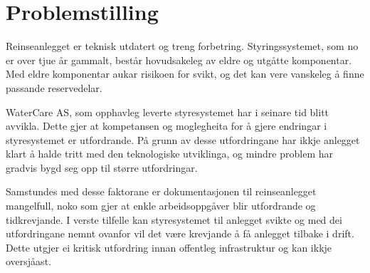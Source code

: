 \section{Problemstilling}
Reinseanlegget er teknisk utdatert og treng forbetring. Styringssystemet, som no er over tjue år gammalt,
består hovudsakeleg av eldre og utgåtte komponentar. Med eldre komponentar aukar risikoen for svikt, 
og det kan vere vanskeleg å finne passande reservedelar.

WaterCare AS\citep{WaterCare}, som opphavleg leverte styresystemet har i seinare tid blitt avvikla. Dette gjer at kompetansen 
og moglegheita for å gjere endringar i styresystemet er utfordrande. 
På grunn av desse utfordringane har ikkje anlegget klart å halde tritt med den teknologiske utviklinga, 
og mindre problem har gradvis bygd seg opp til større utfordringar.

Samstundes med desse faktorane er dokumentasjonen til reinseanlegget mangelfull, noko som gjer at enkle arbeidsoppgåver blir utfordrande og tidkrevjande.
I verste tilfelle kan styresystemet til anlegget svikte og med dei utfordringane nemnt ovanfor vil det være krevjande
å få anlegget tilbake i drift. \newline 
Dette utgjer ei kritisk utfordring innan offentleg infrastruktur og kan ikkje oversjåast.
\newline

